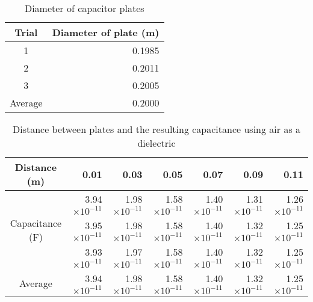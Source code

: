 \documentclass [12pt, letterpaper, twoside] {article}
\begin{document}
\begin{table}[h!]
  \centering
  \begin{tabular}{| c | r |}
    \hline\hline
    Trial & Diameter of plate (m) \\
    \hline
    1 & 0.1985 \\
    \hline
    2 & 0.2011 \\
    \hline
    3 & 0.2005 \\
    \hline
    Average & 0.2000 \\ %
    \hline\hline
  \end{tabular}
  \caption{Diameter of capacitor plates}
\end{table}

\begin{table}[h!]
  \centering
  \begin{tabular}{| c | r | r | r | r | r | r |}
    \hline\hline
    Distance (m) & 0.01 & 0.03 & 0.05 & 0.07 & 0.09 & 0.11 \\
    \hline
    \multirow {3}{*}{Capacitance (F)} & 3.94\(\times10^{-11}\) & 1.98\(\times10^{-11}\) & 1.58\(\times10^{-11}\) & 1.40\(\times10^{-11}\) & 1.31\(\times10^{-11}\) & 1.26\(\times10^{-11}\) \\
    & 3.95\(\times10^{-11}\) & 1.98\(\times10^{-11}\) & 1.58\(\times10^{-11}\) & 1.40\(\times10^{-11}\) & 1.32\(\times10^{-11}\) & 1.25\(\times10^{-11}\) \\
    & 3.93\(\times10^{-11}\) & 1.97\(\times10^{-11}\) & 1.58\(\times10^{-11}\) & 1.40\(\times10^{-11}\) & 1.32\(\times10^{-11}\) & 1.25\(\times10^{-11}\) \\
    \hline
    Average & 3.94\(\times10^{-11}\) & 1.98\(\times10^{-11}\) & 1.58\(\times10^{-11}\) & 1.40\(\times10^{-11}\) & 1.32\(\times10^{-11}\) & 1.25\(\times10^{-11}\) \\ %
    \hline\hline
  \end{tabular}
  \caption{Distance between plates and the resulting capacitance using air as a dielectric}
\end{table}
\end{document}
